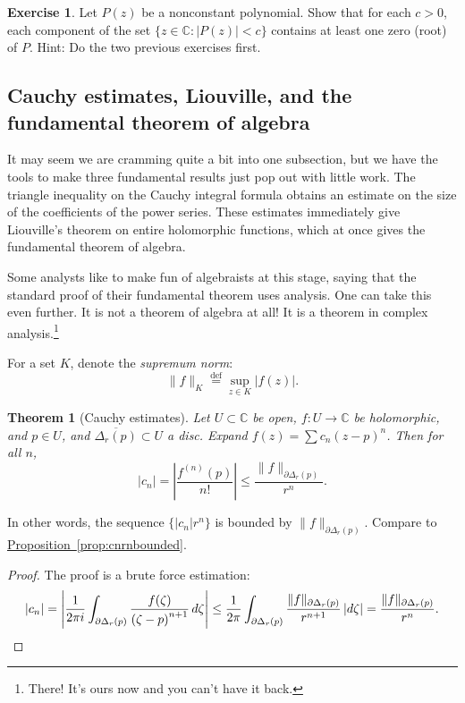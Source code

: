 \documentclass[12pt,openany]{book}
\newcommand{\sabs}[1]{\lvert {#1} \rvert}
\newcommand{\snorm}[1]{\lVert {#1} \rVert}
\newcommand{\abs}[1]{\left\lvert {#1} \right\rvert}
\newcommand{\C}{{\mathbb{C}}}
\newcommand{\myindex}[1]{#1\index{#1}}
\theoremstyle{plain}
\newtheorem{thm}{Theorem}[section]
\theoremstyle{remark}
\theoremstyle{definition}
\newenvironment{exbox}{%
    \def\FrameCommand{\vrule width 1pt \relax\hspace{10pt}}%
    \MakeFramed{\advance\hsize-\width\FrameRestore}%
}{%
    \endMakeFramed
}
\theoremstyle{exercise}
\newtheorem{exercise}{Exercise}[section]
\theoremstyle{example}
\newcommand{\propref}[1]{\hyperref[#1]{Proposition~\ref*{#1}}}
\begin{document}
\begin{exbox}
\begin{exercise}
Let $P(z)$ be a nonconstant polynomial.  Show that for each $c > 0$,
each component of the set $\bigl\{ z \in \C : \sabs{P(z)} < c \bigr\}$
contains at least one zero (root) of $P$.  Hint: Do the two previous
exercises first.
\end{exercise}
\end{exbox}


\subsection{Cauchy estimates, Liouville, and the fundamental theorem of
algebra}

It may seem we are cramming quite a bit into one subsection, but
we have the tools to make three fundamental results just pop out
with little work.  The triangle inequality on
the Cauchy integral formula obtains an estimate on the size of the
coefficients of the power series.  These estimates immediately give
Liouville's theorem on entire holomorphic functions, which at once gives the
fundamental theorem of algebra.

Some analysts like to make fun of algebraists at this stage, saying that the
standard proof of their fundamental theorem uses analysis.
One can take this even further.
It is not a theorem of algebra at all!
It is a theorem in
complex analysis.\footnote{There! It's ours now and you can't have it back.}

For a set $K$, denote the \emph{\myindex{supremum norm}}:
%
\begin{equation*}
\snorm{f}_K
\overset{\text{def}}{=}
\sup_{z \in K} \sabs{f(z)} .
\end{equation*}

\begin{thm}[Cauchy estimates]
Let $U \subset \C$ be open, $f \colon U \to \C$ be
holomorphic, and $p \in U$, and $\overline{\Delta_r(p)} \subset U$
a disc.  Expand $f(z) = \sum c_n {(z-p)}^n$.
Then for all $n$,
\begin{equation*}
\sabs{c_n} =
\abs{\frac{f^{(n)}(p)}{n!}}
\leq
\frac{\snorm{f}_{\partial \Delta_r(p)}}{r^{n}} .
\end{equation*}
\end{thm}

In other words, the sequence $\bigl\{ \sabs{c_n} r^n \bigr\}$ is bounded by
$\snorm{f}_{\partial \Delta_r(p)}$.  Compare to \propref{prop:cnrnbounded}.

\begin{proof}
The proof is a brute force estimation:
\begin{equation*}
\sabs{c_n}  = 
\abs{
\frac{1}{2\pi i}
\int_{\partial \Delta_r(p)}
\frac{f(\zeta)}{{(\zeta-p)}^{n+1}}
\,
d \zeta 
}
\leq
\frac{1}{2\pi}
\int_{\partial \Delta_r(p)}
\frac{\snorm{f}_{\partial \Delta_r(p)}}{r^{n+1}}
\,
\sabs{d \zeta} 
=
\frac{\snorm{f}_{\partial \Delta_r(p)}}{r^{n}} .
\qedhere
\end{equation*}
\end{proof}
\end{document}

